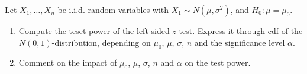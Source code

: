 
\begin{exercise}

Let $X_1, \dots, X_n$ be i.i.d. random variables with $X_1 \sim N(\mu, \sigma^2)$, and $H_0: \mu = \mu_0$.

\begin{enumerate}[label = (\alph*)]

    \item Compute the teset power of the left-sided $z$-test.
    Express it through cdf of the $N(0, 1)$-distribution, depending on $\mu_0$, $\mu$, $\sigma$, $n$ and the significance level $\alpha$.

    \item Comment on the impact of $\mu_0$, $\mu$, $\sigma$, $n$ and $\alpha$ on the test power.

\end{enumerate}

\end{exercise}


\begin{solution}

\phantom{}

\end{solution}

